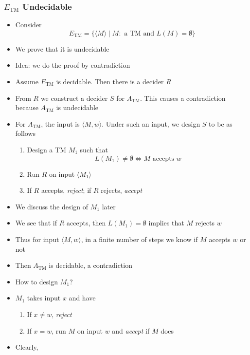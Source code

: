 \begin{frame}[allowframebreaks]
\frametitle{$E_{\text{TM}}$ Undecidable}
\begin{itemize}
\item Consider  
  \begin{equation*}
    E_{\text{TM}} = \{
\langle  M\rangle \mid M: \mbox{ a TM and } L(M) = \emptyset\}    
  \end{equation*}
\item We prove that it is undecidable
\item Idea: we do the proof by contradiction
\item Assume $E_{\text{TM}}$ is decidable. Then there is a decider
  $R$
\item From $R$ we construct a decider $S$ for $A_{\text{TM}}$. This causes
   a contradiction because $A_{\text{TM}}$ is undecidable
 \item For $A_{\text{TM}}$, the input is $\langle M, w \rangle$. Under such an input, we design $S$ to be as follows
   \begin{enumerate}
   \item Design a TM $M_1$ such that
     \begin{equation}
       \label{eq:M1}
       L(M_1) \neq \emptyset \Leftrightarrow M \text{ accepts } w
     \end{equation}
   \item Run $R$ on input $\langle M_1\rangle$
   \item If $R$ accepts, {\em reject}; if $R$ rejects, {\em accept}
   \end{enumerate}
 \item We discuss the design of $M_1$ later
 \item We see that if $R$ accepts, then $L(M_1) = \emptyset$
   implies that $M$ rejects $w$
 \item Thus for input $\langle M, w \rangle$, in a finite
   number of steps we know if $M$ accepts $w$ or not
 \item Then $A_{\text{TM}}$ is decidable, a contradiction
 \item How to design $M_1$?
 \item $M_1$ takes input $x$ and have
   \begin{enumerate}
   \item If $x \neq w$, {\em reject}
   \item If $x = w$, run $M$ on input $w$ and {\em accept} if $M$ does
   \end{enumerate}
 \item Clearly,

\end{itemize}
\end{frame}
